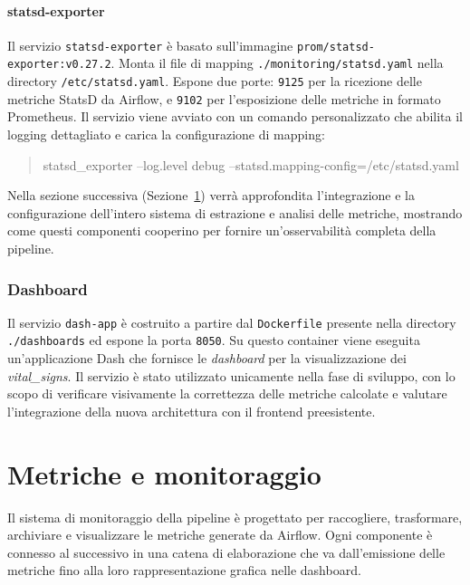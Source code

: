 \paragraph{statsd-exporter}
Il servizio \texttt{statsd-exporter} è basato sull’immagine \texttt{prom/statsd-exporter:v0.27.2}.  
Monta il file di mapping \texttt{./monitoring/statsd.yaml} nella directory \texttt{/etc/statsd.yaml}.  
Espone due porte: \texttt{9125} per la ricezione delle metriche StatsD da Airflow, e \texttt{9102} per l’esposizione delle metriche in formato Prometheus.  
Il servizio viene avviato con un comando personalizzato che abilita il logging dettagliato e carica la configurazione di mapping:
\begin{quote}\ttfamily
statsd\_exporter --log.level debug --statsd.mapping-config=/etc/statsd.yaml
\end{quote}

Nella sezione successiva (Sezione~\ref{sec:implmonitoring}) verrà approfondita l’integrazione e la configurazione dell’intero sistema di estrazione e analisi delle metriche, mostrando come questi componenti cooperino per fornire un’osservabilità completa della pipeline.


\subsubsection{Dashboard}

Il servizio \texttt{dash-app} è costruito a partire dal \texttt{Dockerfile} presente nella directory \texttt{./dashboards} ed espone la porta \texttt{8050}.  
Su questo container viene eseguita un’applicazione Dash che fornisce le \emph{dashboard} per la visualizzazione dei \textit{vital\_signs}.  
Il servizio è stato utilizzato unicamente nella fase di sviluppo, con lo scopo di verificare visivamente la correttezza delle metriche calcolate e valutare l’integrazione della nuova architettura con il frontend preesistente.  

\section{Metriche e monitoraggio}
\label{sec:implmonitoring}


Il sistema di monitoraggio della pipeline è progettato per raccogliere, trasformare, archiviare e visualizzare le metriche generate da Airflow.  
Ogni componente è connesso al successivo in una catena di elaborazione che va dall’emissione delle metriche fino alla loro rappresentazione grafica nelle dashboard.  


